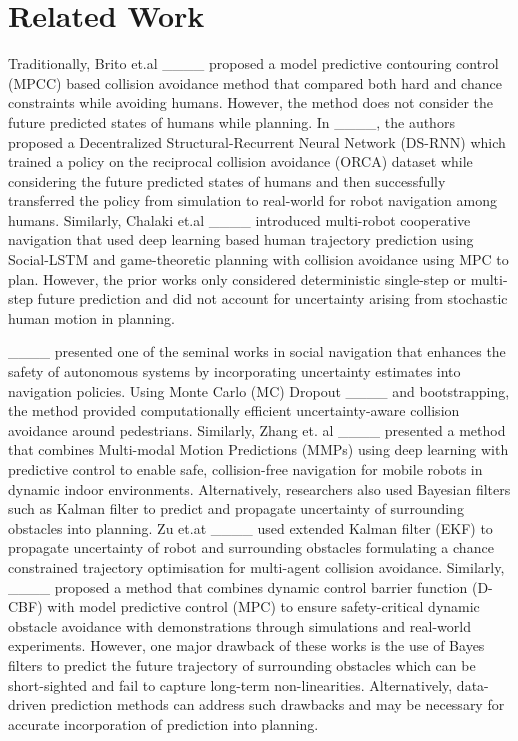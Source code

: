 \section{Related Work}
Traditionally, Brito et.al ____ proposed a model predictive contouring control (MPCC) based  collision avoidance method that compared both hard and chance constraints while avoiding humans. However, the method does not consider the future predicted states of humans while planning. In ____,  the authors proposed a Decentralized Structural-Recurrent Neural Network (DS-RNN) which trained a policy on the reciprocal collision avoidance (ORCA) dataset while considering the future predicted states of humans  and then successfully transferred the policy from simulation to real-world for robot navigation among humans.  Similarly, Chalaki et.al ____ introduced multi-robot cooperative navigation that used deep learning based human trajectory prediction using Social-LSTM and game-theoretic planning with collision avoidance  using MPC to plan. However, the prior works only considered deterministic single-step or multi-step future prediction and did not account for  uncertainty arising from stochastic human motion in planning.


 ____ presented one of the seminal works in social navigation   that enhances the safety of autonomous systems by incorporating uncertainty estimates into navigation policies. Using Monte Carlo (MC) Dropout ____ and bootstrapping, the method provided computationally efficient uncertainty-aware collision avoidance around pedestrians.
Similarly, Zhang et. al ____ presented a method that combines Multi-modal Motion Predictions (MMPs) using deep learning with predictive control to enable safe, collision-free navigation for mobile robots in dynamic indoor environments. Alternatively, researchers also used   Bayesian filters such as Kalman filter to predict and propagate uncertainty of surrounding obstacles into planning.  Zu et.at ____ used extended Kalman filter (EKF) to propagate uncertainty of robot and surrounding obstacles formulating  a chance constrained trajectory optimisation for multi-agent collision avoidance. Similarly, 
____  proposed a method that combines dynamic control barrier function (D-CBF)  with model predictive control (MPC) to ensure safety-critical dynamic obstacle avoidance with demonstrations through simulations and real-world experiments. However, one major drawback of these works is the use of Bayes filters to predict the future trajectory of surrounding obstacles which can be short-sighted and fail to capture long-term non-linearities.  Alternatively,   data-driven prediction methods can address such drawbacks and may be necessary for accurate incorporation of prediction into planning. 

